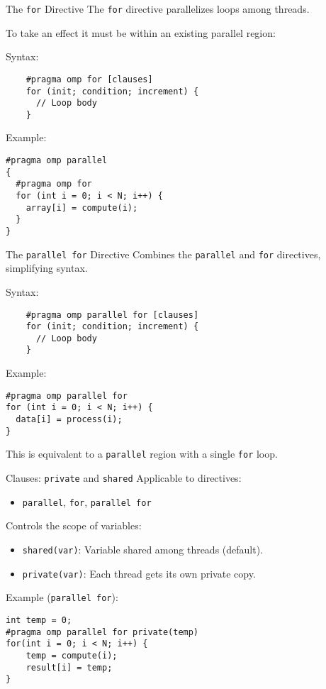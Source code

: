 \documentclass{beamer}
\begin{document}
\begin{frame}[fragile]{The \texttt{for} Directive}
  The \texttt{for} directive parallelizes loops among threads.

  To take an effect it must be within an existing parallel region:

  Syntax:
  \begin{verbatim}
    #pragma omp for [clauses]
    for (init; condition; increment) {
      // Loop body
    }
  \end{verbatim}

  Example:
  \lstset{style=CStyle}
  \begin{lstlisting}
#pragma omp parallel
{
  #pragma omp for
  for (int i = 0; i < N; i++) {
    array[i] = compute(i);
  }
}
  \end{lstlisting}
\end{frame}

\begin{frame}[fragile]{The \texttt{parallel for} Directive}
  Combines the \texttt{parallel} and \texttt{for} directives, simplifying syntax.

  Syntax:
  \begin{verbatim}
    #pragma omp parallel for [clauses]
    for (init; condition; increment) {
      // Loop body
    }
  \end{verbatim}

  Example:
  \lstset{style=CStyle}
  \begin{lstlisting}
#pragma omp parallel for
for (int i = 0; i < N; i++) {
  data[i] = process(i);
}
  \end{lstlisting}

  This is equivalent to a \texttt{parallel} region with a single \texttt{for} loop.
\end{frame}

\begin{frame}[fragile]{Clauses: \texttt{private} and \texttt{shared}}
  Applicable to directives:
  \begin{itemize}
    \item \texttt{parallel}, \texttt{for}, \texttt{parallel for}
  \end{itemize}

  Controls the scope of variables:

  \begin{itemize}
    \item \texttt{shared(var)}: Variable shared among threads (default).
    \item \texttt{private(var)}: Each thread gets its own private copy.
  \end{itemize}

  Example (\texttt{parallel for}):
  \lstset{style=CStyle}
  \begin{lstlisting}
int temp = 0;
#pragma omp parallel for private(temp)
for(int i = 0; i < N; i++) {
    temp = compute(i);
    result[i] = temp;
}
  \end{lstlisting}
\end{frame}
\end{document}
